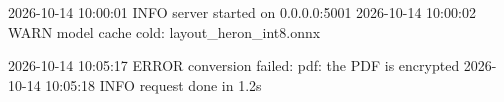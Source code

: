\documentclass[11pt,a4paper]{article}
\begin{document}
2026-10-14 10:00:01 INFO  server started on 0.0.0.0:5001
2026-10-14 10:00:02 WARN  model cache cold: layout\_heron\_int8.onnx

2026-10-14 10:05:17 ERROR conversion failed: pdf: the PDF is encrypted
2026-10-14 10:05:18 INFO  request done in 1.2s
\end{document}
